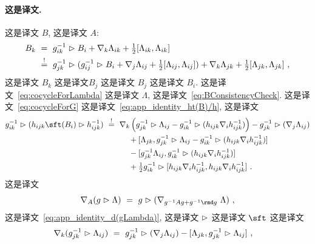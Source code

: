\documentclass[
    affil-it, %
    auth-lg, %
    british, %
    compression, %
    contents, %
    custom-packages={}, %
    references={bigone}, %
]{lib/preprint}
\begin{document}
\begin{body}
        \paragraph{这是译文.}
 这是译文 $ B $, 这是译文 $ A $: 
        \begin{equation}\label{eq:BConsistencyCheck}
            \begin{aligned}
                B_k\ &=\ g^{-1}_{ik}\vartriangleright B_i+\nabla_k\Lambda_{ik}+\tfrac12[\Lambda_{ik},\Lambda_{ik}]
                \\
                &\overset{!}{=}\ g^{-1}_{jk}\vartriangleright (g^{-1}_{ij}\vartriangleright B_i+\nabla_j\Lambda_{ij}+\tfrac12[\Lambda_{ij},\Lambda_{ij}])+\nabla_k\Lambda_{jk}+\tfrac12[\Lambda_{jk},\Lambda_{jk}]~,
            \end{aligned}
        \end{equation}  这是译文 $B_k$ 这是译文$ B_j$ 这是译文 $B_j$ 这是译文 $B_i$. 这是译文~\eqref{eq:cocycleForLambda} 这是译文 $\Lambda$, 这是译文~\eqref{eq:BConsistencyCheck}. 这是译文~\eqref{eq:cocycleForG} 这是译文~\eqref{eq:app_identity_ht(B)/h}, 这是译文         \begin{equation}
            \begin{aligned}
                g^{-1}_{ik}\acton(h_{ijk}\sft(B_i)\acton h^{-1}_{ijk})\ &\overset{!}{=}\ \nabla_k\left(g^{-1}_{jk}\acton \Lambda_{ij}-g^{-1}_{ik}\acton(h_{ijk}\nabla_i h^{-1}_{ijk})\right)-g^{-1}_{jk}\acton(\nabla_j\Lambda_{ij})
                \\
                &\kern1cm+[\Lambda_{jk},g^{-1}_{jk}\acton \Lambda_{ij}-g^{-1}_{ik}\acton(h_{ijk}\nabla_i h^{-1}_{ijk})]
                \\
                &\kern1cm-[g^{-1}_{jk}\Lambda_{ij},g^{-1}_{ik}\acton(h_{ijk}\nabla_i h^{-1}_{ijk})]
                \\
                &\kern1cm+\tfrac12 g^{-1}_{ik}\acton[h_{ijk}\nabla_i h^{-1}_{ijk},h_{ijk}\nabla_i h^{-1}_{ijk}]~.
            \end{aligned}
        \end{equation}  这是译文         \begin{equation}
            \nabla_A(g\acton \Lambda)\ =\ g\acton(\nabla_{g^{-1}Ag+g^{-1}\rmd g}~\Lambda)~,
        \end{equation}  这是译文~\eqref{eq:app_identity_d(gLambda)}, 这是译文 $\vartriangleright$ 这是译文 $\sft$ 这是译文         \begin{equation}
            \begin{aligned}
                \nabla_k(g^{-1}_{jk}\acton\Lambda_{ij})\ &=\ g^{-1}_{jk}\acton(\nabla_j\Lambda_{ij})-[\Lambda_{jk},g^{-1}_{jk}\acton\Lambda_{ij}]~,

\end{aligned}
\end{equation}
\end{body}
\end{document}
